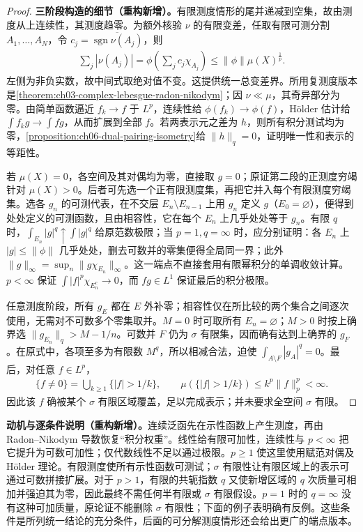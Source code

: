 \documentclass[../../main.tex]{subfiles}
\begin{document}
\begin{proof}
\textbf{三阶段构造的细节（重构新增）。}有限测度情形的尾并递减到空集，故由测度从上连续性，其测度趋零。为额外核验 $\nu$ 的有限变差，任取有限可测分割 $A_1,\ldots,A_N$，令 $c_j=\overline{\operatorname{sgn}\nu(A_j)}$，则
\begin{align*}
\sum_j|\nu(A_j)|=\phi\left(\sum_jc_j\chi_{A_j}\right)
\leqslant\|\phi\|\mu(X)^{\frac1p}.
\end{align*}
左侧为非负实数，故中间式取绝对值不变。这提供统一总变差界。所用复测度版本是\cref{theorem:ch03-complex-lebesgue-radon-nikodym}；因 $\nu\ll\mu$，其奇异部分为零。由简单函数逼近 $f_k\to f$ 于 $L^p$，连续性给 $\phi(f_k)\to\phi(f)$，Hölder 估计给 $\int f_kg\to\int fg$，从而扩展到全部 $f$。若两表示元之差为 $h$，则所有积分测试均为零，\cref{proposition:ch06-dual-pairing-isometry}给 $\|h\|_q=0$，证明唯一性和表示的等距性。

若 $\mu(X)=0$，各空间及其对偶均为零，直接取 $g=0$；原证第二段的正测度穷竭针对 $\mu(X)>0$。后者可先选一个正有限测度集，再把它并入每个有限测度穷竭集。选各 $g_n$ 的可测代表，在不交层 $E_n\setminus E_{n-1}$ 上用 $g_n$ 定义 $g$（$E_0=\varnothing$），便得到处处定义的可测函数，且由相容性，它在每个 $E_n$ 上几乎处处等于 $g_n$。有限 $q$ 时，$\int_{E_n}|g|^q\uparrow\int|g|^q$ 给原范数极限；当 $p=1,q=\infty$ 时，应分别证明：各 $E_n$ 上 $|g|\leqslant\|\phi\|$ 几乎处处，删去可数并的零集便得全局同一界；此外 $\|g\|_\infty=\sup_n\|g\chi_{E_n}\|_\infty$。这一端点不直接套用有限幂积分的单调收敛计算。$p<\infty$ 保证 $\int|f|^p\chi_{E_n^c}\to0$，而 $fg\in L^1$ 保证最后的积分极限。

任意测度阶段，所有 $g_E$ 都在 $E$ 外补零；相容性仅在所比较的两个集合之间逐次使用，无需对不可数多个零集取并。$M=0$ 时可取所有 $E_n=\varnothing$；$M>0$ 时按上确界选 $\|g_{E_n}\|_q>M-1/n$。可数并 $F$ 仍为 $\sigma$ 有限集，因而确有达到上确界的 $g_F$。在原式中，各项至多为有限数 $M^q$，所以相减合法，迫使 $\int_{A\setminus F}|g_A|^q=0$。最后，对任意 $f\in L^p$，
\begin{align*}
\{f\ne0\}=\bigcup_{k\geqslant1}\{|f|>1/k\},\qquad
\mu(\{|f|>1/k\})\leqslant k^p\|f\|_p^p<\infty.
\end{align*}
因此该 $f$ 确被某个 $\sigma$ 有限区域覆盖，足以完成表示；并未要求全空间 $\sigma$ 有限。
\end{proof}
\begin{remark}
\textbf{动机与逐条件说明（重构新增）。}连续泛函先在示性函数上产生测度，再由 Radon–Nikodym 导数恢复“积分权重”。线性给有限可加性，连续性与 $p<\infty$ 把它提升为可数可加性；仅代数线性不足以通过极限。$p\geqslant1$ 使这里使用赋范对偶及 Hölder 理论。有限测度使所有示性函数可测试；$\sigma$ 有限性让有限区域上的表示可通过可数拼接扩展。对于 $p>1$，有限的共轭指数 $q$ 又使新增区域的 $q$ 次质量可相加并强迫其为零，因此最终不需任何半有限或 $\sigma$ 有限假设。$p=1$ 时的 $q=\infty$ 没有这种可加质量，原论证不能删除 $\sigma$ 有限性；下面的例子表明确有反例。这些条件是所列统一结论的充分条件，后面的可分解测度情形还会给出更广的端点版本。
\end{remark}
\end{document}
